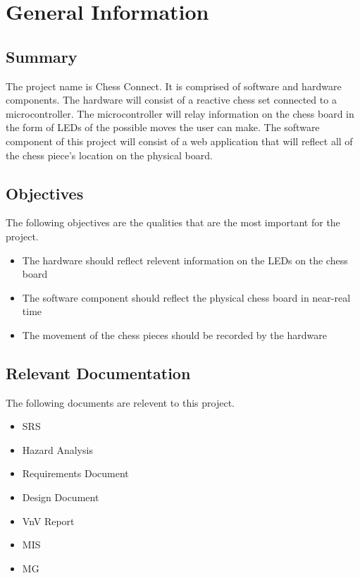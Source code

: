 \documentclass[12pt, titlepage]{article}
\begin{document}

\newpage


\section{General Information}

\subsection{Summary}
The project name is Chess Connect. It is comprised of software and hardware components. The hardware will consist of a reactive chess set 
connected to a microcontroller. The microcontroller will relay information on the chess board in the form of LEDs of the possible moves the user can make.
The software component of this project will consist of a web application that will reflect all of the chess piece's location on the physical board.

\subsection{Objectives}
The following objectives are the qualities that are the most important for the project.
\begin{itemize}
  \item The hardware should reflect relevent information on the LEDs on the chess board
  \item The software component should reflect the physical chess board in near-real time
  \item The movement of the chess pieces should be recorded by the hardware
\end{itemize}

\subsection{Relevant Documentation}
The following documents are relevent to this project.
\begin{itemize}
  \item SRS
  \item Hazard Analysis
  \item Requirements Document
  \item Design Document
  \item VnV Report
  \item MIS
  \item MG
\end{itemize}
\end{document}
